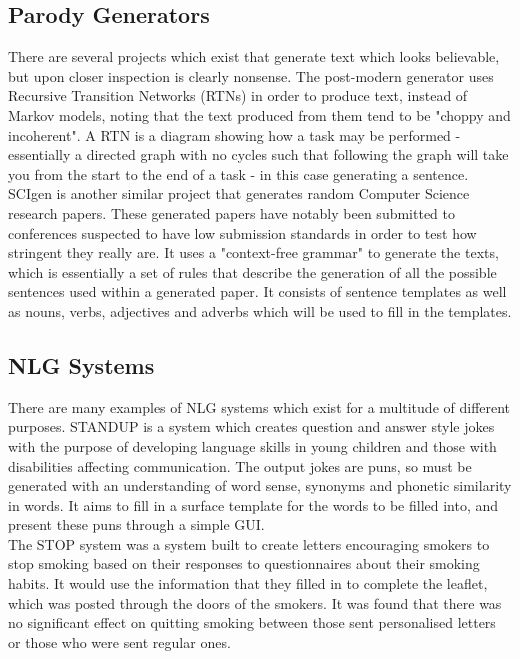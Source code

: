 \subsection{Parody Generators}
There are several projects which exist that generate text which looks believable, but upon closer inspection is clearly nonsense.
The post-modern generator uses Recursive Transition Networks (RTNs) in order to produce text, instead of Markov models, noting that the text produced from them tend to be "choppy and incoherent". A RTN is a diagram showing how a task may be performed - essentially a directed graph with no cycles such that following the graph will take you from the start to the end of a task - in this case generating a sentence.\\
SCIgen is another similar project that generates random Computer Science research papers. These generated papers have notably been submitted to conferences suspected to have low submission standards in order to test how stringent they really are. It uses a "context-free grammar" to generate the texts, which is essentially a set of rules that describe the generation of all the possible sentences used within a generated paper. It consists of sentence templates as well as nouns, verbs, adjectives and adverbs which will be used to fill in the templates. 
\\


\subsection{NLG Systems}
There are many examples of NLG systems which exist for a multitude of different purposes.
STANDUP is a system which creates question and answer style jokes with the purpose of developing language skills in young children and those with disabilities affecting communication. The output jokes are puns, so must be generated with an understanding of word sense, synonyms and phonetic similarity in words. It aims to fill in a surface template for the words to be filled into, and present these puns through a simple GUI.\\

The STOP system was a system built to create letters encouraging smokers to stop smoking based on their responses to questionnaires about their smoking habits. It would use the information that they filled in to complete the leaflet, which was posted through the doors of the smokers. It was found that there was no significant effect on quitting smoking between those sent personalised letters or those who were sent regular ones.
